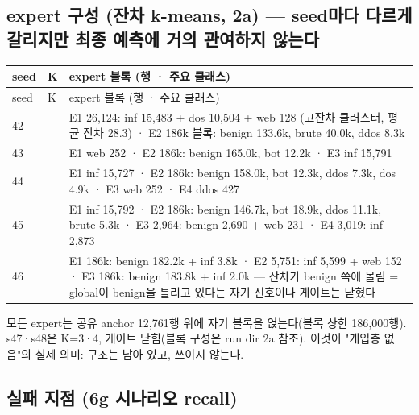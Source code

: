 \subsection*{expert 구성 (잔차 k-means, 2a) — seed마다 다르게 갈리지만 최종 예측에 거의 관여하지 않는다}
\begingroup
\footnotesize
\begin{longtable}{>{\raggedright\arraybackslash}p{}>{\raggedright\arraybackslash}p{}>{\raggedright\arraybackslash}p{}}
\toprule
seed & K & expert 블록 (행 · 주요 클래스) \\ \midrule
\endfirsthead
seed & K & expert 블록 (행 · 주요 클래스) \\ \midrule
\endhead
{}42 & 2 & E1 26,124: inf 15,483 +\allowbreak{} dos 10,504 +\allowbreak{} web 128 (고잔차 클러스터, 평균 잔차 28.3) · E2 186k 블록: benign 133.6k, brute 40.0k, ddos 8.3k \\
{}43 & 3 & E1 web 252 · E2 186k: benign 165.0k, bot 12.2k · E3 inf 15,791 \\
{}44 & 4 & E1 inf 15,727 · E2 186k: benign 158.0k, bot 12.3k, ddos 7.3k, dos 4.9k · E3 web 252 · E4 ddos 427 \\
{}45 & 4 & E1 inf 15,792 · E2 186k: benign 146.7k, bot 18.9k, ddos 11.1k, brute 5.3k · E3 2,964: benign 2,690 +\allowbreak{} web 231 · E4 3,019: inf 2,873 \\
{}46 & 3 & E1 186k: benign 182.2k +\allowbreak{} inf 3.8k · E2 5,751: inf 5,599 +\allowbreak{} web 152 · E3 186k: benign 183.8k +\allowbreak{} inf 2.0k — 잔차가 benign 쪽에 몰림 =\allowbreak{} global이 benign을 틀리고 있다는 자기 신호이나 게이트는 닫혔다 \\
\bottomrule
\end{longtable}
\endgroup
모든 expert는 공유 anchor 12,761행 위에 자기 블록을 얹는다(블록 상한 186,000행). s47·s48은 K=\allowbreak{}3·4, 게이트 닫힘(블록 구성은 run dir 2a 참조). 이것이 "개입층 없음"의 실제 의미: 구조는 남아 있고, 쓰이지 않는다.

\subsection*{실패 지점 (6g 시나리오 recall)}
